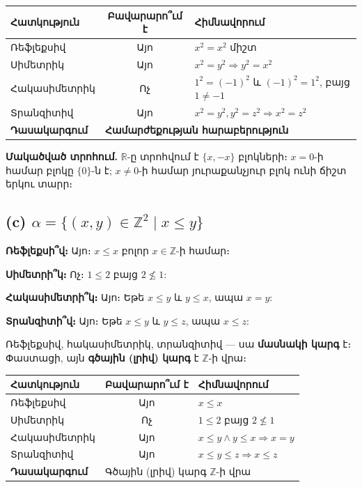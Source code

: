 \documentclass[12pt, a4paper]{article}
\newcommand{\Z}{\mathbb{Z}}
\newcommand{\R}{\mathbb{R}}
\begin{document}
\begin{center}
\renewcommand{\arraystretch}{1.15}
\begin{tabular}{l|c|l}
  \toprule
  \textbf{Հատկություն} & \textbf{Բավարարո՞ւմ է} & \textbf{Հիմնավորում} \\
  \midrule
  Ռեֆլեքսիվ      & Այո & $x^2 = x^2$ միշտ \\
  Սիմետրիկ      & Այո & $x^2=y^2 \Rightarrow y^2=x^2$ \\
  Հակասիմետրիկ  & Ոչ  & $1^2=(-1)^2$ և $(-1)^2=1^2$, բայց $1\ne -1$ \\
  Տրանզիտիվ     & Այո & $x^2=y^2, y^2=z^2 \Rightarrow x^2=z^2$ \\
  \midrule
  \textbf{Դասակարգում} & \multicolumn{2}{l}{\textbf{Համարժեքության հարաբերություն}} \\
  \bottomrule
\end{tabular}
\end{center}

\smallskip
\textbf{Մակածված տրոհում.}\; $\R$-ը տրոհվում է $\{x,-x\}$ բլոկների։ $x=0$-ի համար բլոկը $\{0\}$-ն է; $x\ne 0$-ի համար յուրաքանչյուր բլոկ ունի ճիշտ երկու տարր։

\subsection*{(c)\; $\alpha = \{(x,y) \in \Z^2 \mid x \le y\}$}

\textbf{Ռեֆլեքսի՞վ։} Այո։ $x \le x$ բոլոր $x \in \Z$-ի համար։ \checkmark

\textbf{Սիմետրի՞կ։} Ոչ։ $1 \le 2$ բայց $2 \nleq 1$:

\textbf{Հակասիմետրի՞կ։} Այո։ Եթե $x \le y$ և $y \le x$, ապա $x=y$: \checkmark

\textbf{Տրանզիտի՞վ։} Այո։ Եթե $x \le y$ և $y \le z$, ապա $x \le z$: \checkmark

\begin{answerbox}
Ռեֆլեքսիվ, հակասիմետրիկ, տրանզիտիվ — սա \textbf{մասնակի կարգ} է։ Փաստացի, այն \textbf{գծային (լրիվ) կարգ} է $\Z$-ի վրա։
\end{answerbox}

\begin{center}
\renewcommand{\arraystretch}{1.15}
\begin{tabular}{l|c|l}
  \toprule
  \textbf{Հատկություն} & \textbf{Բավարարո՞ւմ է} & \textbf{Հիմնավորում} \\
  \midrule
  Ռեֆլեքսիվ      & Այո & $x \le x$ \\
  Սիմետրիկ      & Ոչ  & $1\le 2$ բայց $2\nleq 1$ \\
  Հակասիմետրիկ  & Այո & $x\le y\land y\le x \Rightarrow x=y$ \\
  Տրանզիտիվ     & Այո & $x\le y\le z \Rightarrow x\le z$ \\
  \midrule
  \textbf{Դասակարգում} & \multicolumn{2}{l}{Գծային (լրիվ) կարգ $\Z$-ի վրա} \\
  \bottomrule
\end{tabular}
\end{center}
\end{document}

